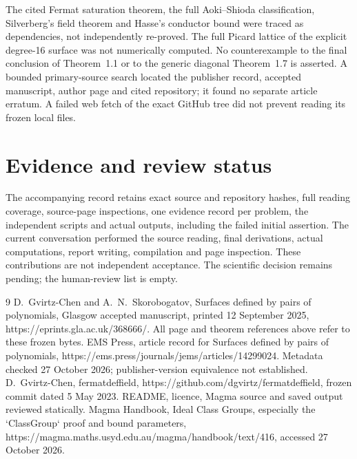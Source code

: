 \documentclass[10pt]{article}
\begin{document}
The cited Fermat saturation theorem, the full Aoki–Shioda classification, Silverberg’s field theorem and Hasse’s conductor bound were traced as dependencies, not independently re-proved. The full Picard lattice of the explicit degree-16 surface was not numerically computed. No counterexample to the final conclusion of Theorem 1.1 or to the generic diagonal Theorem 1.7 is asserted. A bounded primary-source search located the publisher record, accepted manuscript, author page and cited repository; it found no separate article erratum. A failed web fetch of the exact GitHub tree did not prevent reading its frozen local files.\par
\section*{Evidence and review status}
The accompanying record retains exact source and repository hashes, full reading coverage, source-page inspections, one evidence record per problem, the independent scripts and actual outputs, including the failed initial assertion. The current conversation performed the source reading, final derivations, actual computations, report writing, compilation and page inspection. These contributions are not independent acceptance. The scientific decision remains pending; the human-review list is empty.\par
9 D. Gvirtz-Chen and A. N. Skorobogatov, Surfaces defined by pairs of polynomials, Glasgow accepted manuscript, printed 12 September 2025, https://eprints.gla.ac.uk/368666/. All page and theorem references above refer to these frozen bytes. EMS Press, article record for Surfaces defined by pairs of polynomials, https://ems.press/journals/jems/articles/14299024. Metadata checked 27 October 2026; publisher-version equivalence not established. D. Gvirtz-Chen, fermatdeffield, https://github.com/dgvirtz/fermatdeffield, frozen commit dated 5 May 2023. README, licence, Magma source and saved output reviewed statically. Magma Handbook, Ideal Class Groups, especially the `ClassGroup` proof and bound parameters, https://magma.maths.usyd.edu.au/magma/handbook/text/416, accessed 27 October 2026.\par
\end{document}
